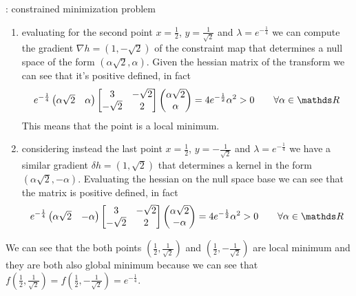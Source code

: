 \begin{example}{: constrained minimization problem}
\begin{enumerate}
			\item evaluating for the second point $x = \frac 1 2$, $y = \frac{1}{\sqrt 2}$ and $\lambda = e^{-\frac 14}$ we can compute the gradient $\nabla h = (1, - \sqrt 2)$ of the constraint map that determines a null space of the form $(\alpha \sqrt 2,\alpha)$. Given the hessian matrix of the transform we can see that it's positive defined, in fact
			\[ e^{-\frac 1 4} \begin{pmatrix}
				\alpha \sqrt 2 & \alpha
			\end{pmatrix} \begin{bmatrix}
				3 & -\sqrt 2 \\ -\sqrt 2 & 2 
			\end{bmatrix} \begin{pmatrix}
				\alpha \sqrt 2 \\ \alpha
			\end{pmatrix} = 4 e^{-\frac 12} \alpha^2 > 0 \qquad \forall \alpha \in \R \]
			This means that the point is a local minimum.
			
			\item considering instead the last point $x = \frac 1 2$, $y = - \frac{1}{\sqrt 2}$ and $\lambda = e^{-\frac 14}$ we have a similar gradient $\delta h = (1,\sqrt 2)$ that determines a kernel in the form $(\alpha \sqrt 2,-\alpha)$. Evaluating the hessian on the null space base we can see that the matrix is positive defined, in fact
			\[ e^{-\frac 1 4} \begin{pmatrix}
				\alpha \sqrt 2 & -\alpha
			\end{pmatrix} \begin{bmatrix}
				3 & -\sqrt 2 \\ -\sqrt 2 & 2 
			\end{bmatrix} \begin{pmatrix}
				\alpha \sqrt 2 \\ -\alpha
			\end{pmatrix} = 4 e^{-\frac 12} \alpha^2 > 0 \qquad \forall \alpha \in \R \]
		\end{enumerate}
		
		We can see that the both points $\left(\frac 12, \frac 1{\sqrt 2}\right)$ and $\left(\frac 12, -\frac 1{\sqrt 2}\right)$ are local minimum and they are both also global minimum because we can see that $f\left(\frac 12, \frac 1{\sqrt 2}\right) = f\left(\frac 12, - \frac 1{\sqrt 2}\right) = e^{-\frac 1 4}$.
	\end{example}
	
	
	
	
	
